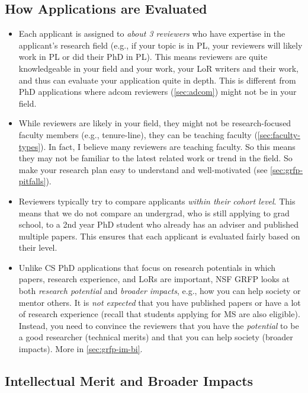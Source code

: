 \documentclass[oneside,11pt]{book}
\begin{document}
\subsection{How Applications are Evaluated}

\begin{itemize}
\item Each applicant is assigned to \emph{about 3 reviewers} who have expertise in the applicant's research field (e.g., if your topic is in PL, your reviewers will likely work in PL or did their PhD in PL). This means reviewers are quite knowledgeable in your field and your work, your LoR writers and their work, and thus can evaluate your application quite in depth. This is different from PhD applications where adcom reviewers (\autoref{sec:adcom}) might not be in your field.

\item While reviewers are likely in your field, they might not be research-focused faculty members (e.g., tenure-line), they can be teaching faculty (\autoref{sec:faculty-types}). In fact, I believe many reviewers are teaching faculty. So this means they may not be familiar to the latest related work or trend in the field. So make your research plan easy to understand and well-motivated (see \autoref{sec:grfp-pitfalls}).


\item Reviewers typically try to compare applicants \emph{within their cohort level}.  This means that we do not compare an undergrad, who is still applying to grad school, to a 2nd year PhD student who already has an adviser and published multiple papers. This ensures that each applicant is evaluated fairly based on their level.

\item Unlike CS PhD applications that focus on research potentials in which papers, research experience, and LoRs are important, NSF GRFP looks at both \emph{research potential} and \emph{broader impacts}, e.g., how you can help society or mentor others.  It is \emph{not expected} that you have published papers or have a lot of research experience (recall that students applying for MS are also eligible). Instead, you need to convince the reviewers that you have the \emph{potential} to be a good researcher (technical merits) and that you can help society (broader impacts). More in \autoref{sec:grfp-im-bi}. 

\end{itemize}


\subsection{Intellectual Merit and Broader Impacts}\label{sec:grfp-im-bi}
\end{document}
